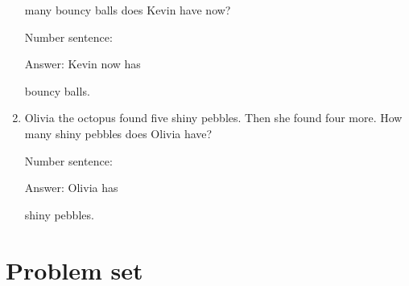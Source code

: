 \documentclass{tufte-book}
\begin{document}
\begin{enumerate}
  many bouncy balls does Kevin have now?\medskip\par
  Number sentence:
  \dotfill\medskip\par
  Answer: Kevin now has
  \dotfill\medskip\par\mbox{}\dotfill\medskip\par\mbox{}\dotfill\bigskip
  bouncy balls.
\item
  Olivia the octopus found five shiny pebbles. Then she found four more.
  How many shiny pebbles does Olivia have?\medskip\par
  Number sentence:
  \dotfill\medskip\par
  Answer: Olivia has
  \dotfill\medskip\par\mbox{}\dotfill\medskip\par\mbox{}\dotfill\bigskip
  shiny pebbles.
\end{enumerate}



\clearpage\section{Problem set }
\end{document}
